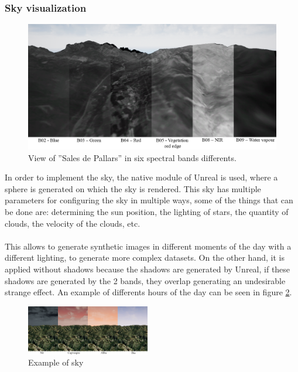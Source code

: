 \documentclass[10pt,a4paper,twocolumn,twoside]{article}
\begin{document}
\subsubsection{Sky visualization}

\begin{figure}[!h]
\centering
  	\includegraphics[width=1\textwidth]{multispectral/bands}
	\caption{View of ''Sales de Pallars'' in six spectral bands differents.}
	\label{fig-bands}
\end{figure}

In order to implement the sky, the native module of Unreal is used, where a sphere is generated on which the sky is rendered. This sky has multiple parameters for configuring the sky in multiple ways, some of the things that can be done are: determining the sun position, the lighting of stars, the quantity of clouds, the velocity of the clouds, etc.
\\\\
This allows to generate synthetic images in different moments of the day with a different lighting, to generate more complex datasets. On the other hand, it is applied without shadows because the shadows are generated by Unreal, if these shadows are generated by the 2 bands, they overlap generating an undesirable strange effect. An example of differents hours of the day can be seen in figure \ref{fig-sky}.

\begin{figure}[!h]
\centering
  	\includegraphics[width=0.48\textwidth]{sky/sky}
	\caption{Example of sky}
	\label{fig-sky}
\end{figure}
\end{document}
